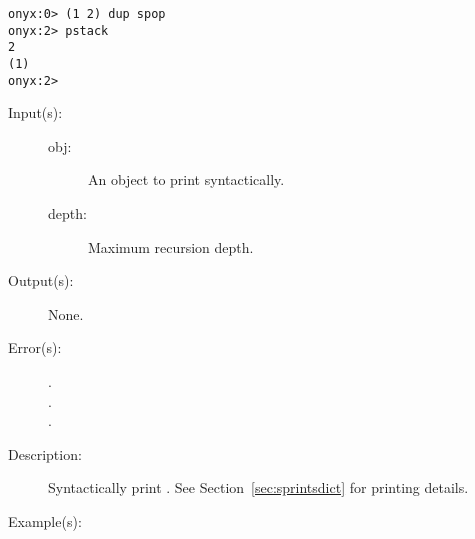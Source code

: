 \begin{description}
\begin{description}
\begin{verbatim}
onyx:0> (1 2) dup spop
onyx:2> pstack
2
(1)
onyx:2>
		\end{verbatim}
	\end{description}
\label{systemdict:sprint}
\item[{\onyxop{obj depth}{sprint}{--}}: ]
	\begin{description}\item[]
	\item[Input(s): ]
		\begin{description}\item[]
		\item[obj: ]
			An object to print syntactically.
		\item[depth: ]
			Maximum recursion depth.
		\end{description}
	\item[Output(s): ] None.
	\item[Error(s): ]
		\begin{description}\item[]
		\item[.]
		\item[.]
		\item[.]
		\end{description}
	\item[Description: ]
		Syntactically print .  See
		Section~\ref{sec:sprintsdict} for printing details.
	\item[Example(s): ]\begin{verbatim}


\end{verbatim}
\end{description}
\end{description}
